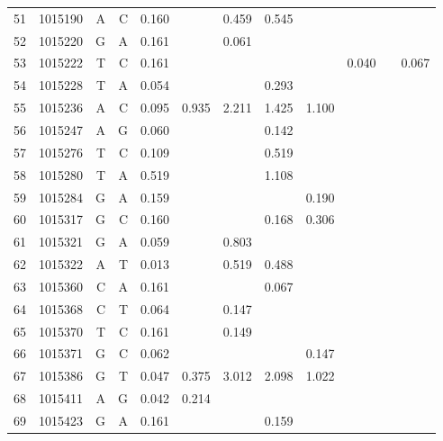 \documentclass{bmcart}
\begin{document}
\begin{table}[htbp]
\begin{threeparttable}
\begin{tabular}{rrrrrrrrrrrr}
    51    & 1015190 & A     & C     & 0.160 &       & 0.459 & 0.545 &       &       &       &  \\
    52    & 1015220 & G     & A     & 0.161 &       & 0.061 &       &       &       &       &  \\
    53    & 1015222 & T     & C     & 0.161 &       &       &       &       & 0.040 &       & 0.067 \\
    54    & 1015228 & T     & A     & 0.054 &       &       & 0.293 &       &       &       &  \\
    55    & 1015236 & A     & C     & 0.095 & 0.935 & 2.211 & 1.425 & 1.100 &       &       &  \\
    56    & 1015247 & A     & G     & 0.060 &       &       & 0.142 &       &       &       &  \\
    57    & 1015276 & T     & C     & 0.109 &       &       & 0.519 &       &       &       &  \\
    58    & 1015280 & T     & A     & 0.519 &       &       & 1.108 &       &       &       &  \\
    59    & 1015284 & G     & A     & 0.159 &       &       &       & 0.190 &       &       &  \\
    60    & 1015317 & G     & C     & 0.160 &       &       & 0.168 & 0.306 &       &       &  \\
    61    & 1015321 & G     & A     & 0.059 &       & 0.803 &       &       &       &       &  \\
    62    & 1015322 & A     & T     & 0.013 &       & 0.519 & 0.488 &       &       &       &  \\
    63    & 1015360 & C     & A     & 0.161 &       &       & 0.067 &       &       &       &  \\
    64    & 1015368 & C     & T     & 0.064 &       & 0.147 &       &       &       &       &  \\
    65    & 1015370 & T     & C     & 0.161 &       & 0.149 &       &       &       &       &  \\
    66    & 1015371 & G     & C     & 0.062 &       &       &       & 0.147 &       &       &  \\
    67    & 1015386 & G     & T     & 0.047 & 0.375 & 3.012 & 2.098 & 1.022 &       &       &  \\
    68    & 1015411 & A     & G     & 0.042 & 0.214 &       &       &       &       &       &  \\
    69    & 1015423 & G     & A     & 0.161 &       &       & 0.159 &       &       &       &  \\

\end{tabular}
\end{threeparttable}
\end{table}
\end{document}
